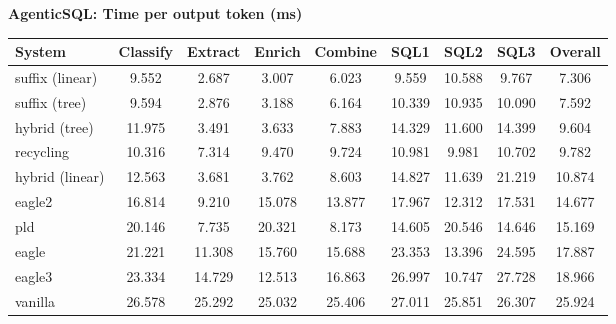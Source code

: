 \textbf{AgenticSQL: Time per output token (ms)}
\begin{table}[H]
\begin{adjustbox}{width=\linewidth}
\centering
\begin{tabular}{lcccccccc}
\toprule
\textbf{System} & Classify & Extract & Enrich & Combine & SQL1 & SQL2 & SQL3 & \textbf{Overall} \\
\midrule
suffix (linear) & 9.552 & 2.687 & 3.007 & 6.023 & 9.559 & 10.588 & 9.767 & 7.306 \\
suffix (tree) & 9.594 & 2.876 & 3.188 & 6.164 & 10.339 & 10.935 & 10.090 & 7.592 \\
hybrid (tree) & 11.975 & 3.491 & 3.633 & 7.883 & 14.329 & 11.600 & 14.399 & 9.604 \\
recycling & 10.316 & 7.314 & 9.470 & 9.724 & 10.981 & 9.981 & 10.702 & 9.782 \\
hybrid (linear) & 12.563 & 3.681 & 3.762 & 8.603 & 14.827 & 11.639 & 21.219 & 10.874 \\
eagle2 & 16.814 & 9.210 & 15.078 & 13.877 & 17.967 & 12.312 & 17.531 & 14.677 \\
pld & 20.146 & 7.735 & 20.321 & 8.173 & 14.605 & 20.546 & 14.646 & 15.169 \\
eagle & 21.221 & 11.308 & 15.760 & 15.688 & 23.353 & 13.396 & 24.595 & 17.887 \\
eagle3 & 23.334 & 14.729 & 12.513 & 16.863 & 26.997 & 10.747 & 27.728 & 18.966 \\
vanilla & 26.578 & 25.292 & 25.032 & 25.406 & 27.011 & 25.851 & 26.307 & 25.924 \\
\bottomrule
\end{tabular}
\end{adjustbox}
\end{table}

